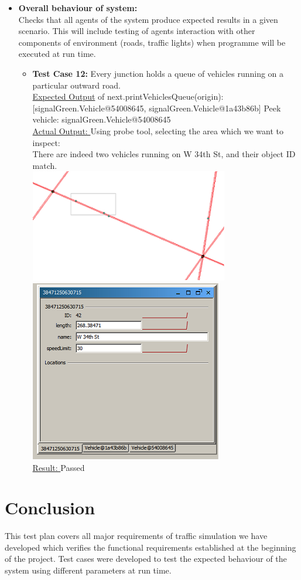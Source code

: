 \documentclass[11pt]{article}
\begin{document}
\begin{itemize}
\item \textbf{Overall behaviour of system: }\hfill \\
		Checks that all agents of the system produce expected results in a given scenario. This will include testing of agents interaction with other components of environment (roads, traffic lights) when programme will be executed 		at run time.\hfill \\
	\begin{itemize}
	\item	\textbf{Test Case 12:} Every junction holds a queue of vehicles running on a particular outward road.\hfill \\
		\underline{Expected Output} of next.printVehiclesQueue(origin):[signalGreen.Vehicle@54008645, signalGreen.Vehicle@1a43b86b] Peek vehicle: signalGreen.Vehicle@54008645\hfill \\
		\underline{Actual Output: }Using probe tool, selecting the area which we want to inspect:\hfill \\
		There are indeed two vehicles running on W 34th St, and their object ID match.\hfill \\
		\includegraphics[scale=0.7]{RoadNetwork}
		\includegraphics{Sim}\hfill \\
			
		\underline{Result: }Passed
			
	\end{itemize}
\end{itemize}
\section{Conclusion}
This test plan covers all major requirements of traffic simulation we have developed which verifies the functional requirements established at the beginning of the project. Test cases were developed to test the expected behaviour of the system using different parameters at run time.
\end{document}
